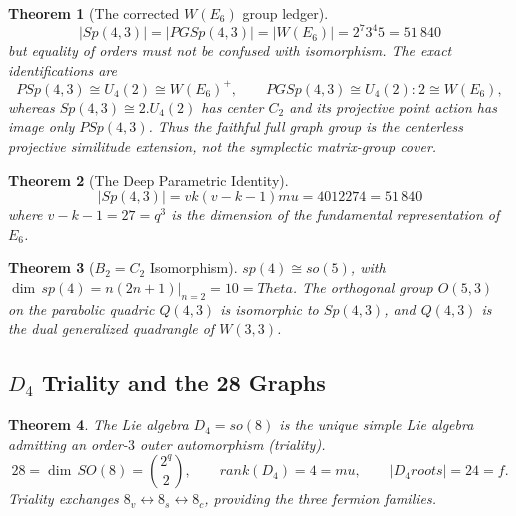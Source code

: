 \documentclass[12pt,a4paper]{article}
\def\mathrm#1{#1}%
\def\mathbf#1{#1}%
\def\mathfrak#1{#1}%
\def\textbf#1{#1}%
\def\text#1{#1}%
\def\mu{mu}%
\def\Theta{Theta}%
\def\cdot{ }%
\newtheorem{theorem}{Theorem}[section]
\theoremstyle{definition}
\newcommand{\Sp}{\mathrm{Sp}}
\newcommand{\PSp}{\mathrm{PSp}}
\newcommand{\PGSp}{\mathrm{PGSp}}
\newcommand{\SO}{\mathrm{SO}}
\begin{document}
\begin{theorem}[The corrected $W(E_6)$ group ledger]
\label{thm:e6}
\begin{equation}
\boxed{|\Sp(4,3)| = |\PGSp(4,3)| = |W(E_6)|
 = 2^7\cdot 3^4\cdot 5 = 51\,840}
\end{equation}
but equality of orders must not be confused with isomorphism.  The exact
identifications are
\begin{equation}
\PSp(4,3)\cong U_4(2)\cong W(E_6)^+,
\qquad
\PGSp(4,3)\cong U_4(2){:}2\cong W(E_6),
\end{equation}
whereas $\Sp(4,3)\cong 2.U_4(2)$ has center $C_2$ and its projective
point action has image only $\PSp(4,3)$.  Thus the faithful full graph
group is the centerless projective similitude extension, not the symplectic
matrix-group cover.
\end{theorem}

\begin{theorem}[The Deep Parametric Identity]
\label{thm:deep}
\begin{equation}
\boxed{|\Sp(4,3)| = v\cdot k\cdot(v-k-1)\cdot\mu
= 40\cdot 12\cdot 27\cdot 4 = 51\,840}
\label{eq:deep}
\end{equation}
where $v-k-1 = 27 = q^3$ is the dimension of the fundamental
representation of $E_6$.
\end{theorem}

\begin{theorem}[$B_2 = C_2$ Isomorphism]
\label{thm:b2c2}
$\mathfrak{sp}(4)\cong\mathfrak{so}(5)$, with
$\dim\,\mathfrak{sp}(4) = n(2n+1)|_{n=2} = 10 = \Theta$.
The orthogonal group $O(5,3)$ on the parabolic quadric $Q(4,3)$ is
isomorphic to $\Sp(4,3)$, and $Q(4,3)$ is the \textbf{dual} generalized
quadrangle of $W(3,3)$.
\end{theorem}


\subsection{\texorpdfstring{$D_4$ Triality and the 28 Graphs}{D4 Triality and the 28 Graphs}}

\begin{theorem}
The Lie algebra $D_4 = \mathfrak{so}(8)$ is the unique simple Lie algebra
admitting an order-$3$ outer automorphism (\textbf{triality}).
\begin{equation}
28 = \dim\,\SO(8) = \binom{2^q}{2}, \qquad
\mathrm{rank}(D_4) = 4 = \mu, \qquad
|D_4\text{ roots}| = 24 = f.
\end{equation}
Triality exchanges $\mathbf{8}_v\leftrightarrow\mathbf{8}_s
\leftrightarrow\mathbf{8}_c$, providing the three fermion families.
\end{theorem}
\end{document}
